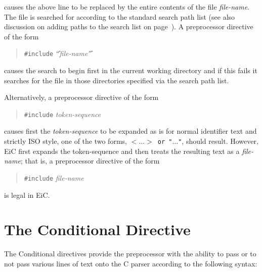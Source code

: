 	causes the above line to be replaced by the entire contents
	of the file {\it file-name}. The file is searched for according
	to the standard search path list (see also discussion on
	adding paths to the search  list on page~\pageref{comm-switch}). 
	A preprocessor directive of the form
	\begin{quote} 
	{\tt \#include} {\it \U{``}file-name\U{''}}  	
	\end{quote}

	causes the search to begin first in the current working
	directory and if this fails it searches for the file in those
	directories specified via the search path list. 

	Alternatively,	a preprocessor directive of the form 
	\begin{quote} {\tt \#include} {\it token-sequence} 
	\end{quote}

	causes first the {\it token-sequence} to be expanded as is for normal
	identifier text and strictly ISO style, one of the two forms,
	{\tt $< \ldots >$ or "$\ldots$"}, should result. However,
	EiC first expands the token-sequence and then treats
	the resulting text as a {\it file-name}; that is, a 
	preprocessor directive of the form 
	\begin{quote} {\tt \#include} {\it file-name} 
	\end{quote}
	is legal in EiC.





\section{The Conditional Directive}
\label{sec:Conditional} 
The Conditional directives provide the preprocessor with the ability
to pass or to not pass various lines of text onto the C parser according to
the following syntax:

\begin{production}
\end{production}

